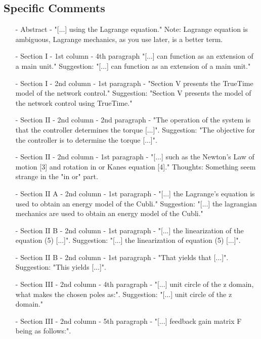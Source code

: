 \subsection{Specific Comments}
\begin{itemize}
	\item[-]Abstract - "[...] using the Lagrange equation."
Note: Lagrange equation is ambiguous, Lagrange mechanics, as you use later, is a better term.\\
	\item[-]Section I - 1st column - 4th paragraph "[...] can function as an extension of a main unit."
Suggestion: "[...] can function as an extension of a main unit."\\	
	\item[-]Section I - 2nd column - 1st paragraph - "Section V presents the TrueTime model of the network control."
Suggestion: "Section V presents the model of the network control using TrueTime."
\\
\item[-]Section II - 2nd column - 2nd paragraph - "The operation of the system is that the controller determines the torque [...]".
Suggestion: "The objective for the controller is to determine the torque [...]".
\\
\item[-]Section II - 2nd column - 1st paragraph - "[...] such as the Newton's Law of motion [3] and rotation in or Kanes equation [4]."
Thoughts: Something seem strange in the "in or" part. 
\\				
\item[-]Section II A - 2nd column - 1st paragraph - "[...] the Lagrange's equation is used to obtain an energy model of the Cubli."
Suggestion: "[...] the lagrangian mechanics are used to obtain an energy model of the Cubli." \\
\item[-]Section II B - 2nd column - 1st paragraph - "[...] the linearization of the equation (5) [...]".
Suggestion: "[...] the linearization of equation (5) [...]".\\
\item[-]Section II B - 2nd column - 1st paragraph - "That yields that [...]".
Suggestion: "This yields [...]".\\	
\item[-]Section III - 2nd column - 4th paragraph - "[...] unit circle of the z domain, what makes the chosen poles as:".
Suggestion: "[...] unit circle of the z domain."\\			
\item[-]Section III - 2nd column - 5th paragraph - "[...] feedback gain matrix F being as follows:".

\end{itemize}
